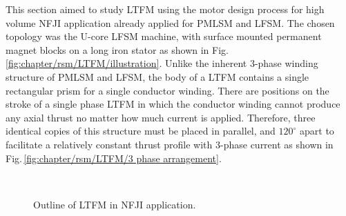         
        This section aimed to study \acs{LTFM} using the motor design process for high volume \acs{NFJI} application already applied for \acs{PMLSM} and \acs{LFSM}. The chosen topology was the U-core \acs{LFSM} machine, with surface mounted permanent magnet blocks on a long iron stator as shown in Fig.\,\ref{fig:chapter/rsm/LTFM/illustration}. Unlike the inherent 3-phase winding structure of \acs{PMLSM} and \acs{LFSM}, the body of a \acs{LTFM} contains a single rectangular prism for a single conductor winding. There are positions on the stroke of a single phase \acs{LTFM} in which the conductor winding cannot produce any axial thrust no matter how much current is applied. Therefore, three identical copies of this structure must be placed in parallel, and $120^\circ$ apart to facilitate a relatively constant thrust profile with 3-phase current as shown in Fig.\,\ref{fig:chapter/rsm/LTFM/3 phase arrangement}. 
        
        
        \begin{figure}[!ht]
            \centering
            \\
            \caption{Outline of \acs{LTFM} in \acs{NFJI} application.}
            \label{fig:chapter/rsm/LTFM/3-phase and NFJI}
        \end{figure}
        
